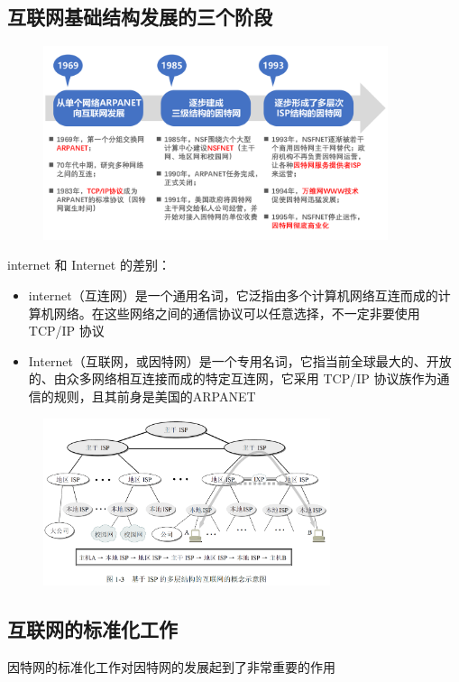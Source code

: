 \documentclass[cs4size,a4paper,10pt]{ctexart}
\begin{document}
	\subsection{互联网基础结构发展的三个阶段}
	\begin{figure}[H]
		\centering
		\includegraphics[width=0.9\textwidth]{img/1.2.2}
	\end{figure}

	internet 和 Internet 的差别：
	\begin{itemize}
		\item internet（互连网）是一个通用名词，它泛指由多个计算机网络互连而成的计算机网络。在这些网络之间的通信协议可以任意选择，不一定非要使用 TCP/IP 协议
		\item Internet（互联网，或因特网）是一个专用名词，它指当前全球最大的、开放的、由众多网络相互连接而成的特定互连网，它采用 TCP/IP 协议族作为通信的规则，且其前身是美国的ARPANET
	\end{itemize}

	\begin{figure}[H]
		\centering
		\includegraphics[width=0.75\textwidth]{img/1.3}
	\end{figure}

	\subsection{互联网的标准化工作}
	因特网的标准化工作对因特网的发展起到了非常重要的作用
\end{document}
